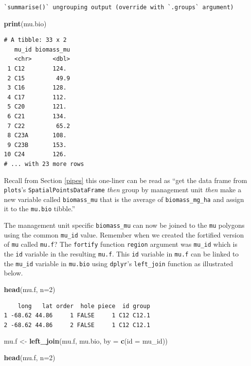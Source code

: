 \documentclass[
]{krantz}
\makeatletter
\newenvironment{Shaded}{\begin{snugshade}}{\end{snugshade}}
\newcommand{\DataTypeTok}[1]{\textcolor[rgb]{0.27,0.27,0.27}{#1}}
\newcommand{\DecValTok}[1]{\textcolor[rgb]{0.06,0.06,0.06}{#1}}
\newcommand{\KeywordTok}[1]{\textcolor[rgb]{0.27,0.27,0.27}{\textbf{#1}}}
\newcommand{\NormalTok}[1]{#1}
\newcommand{\StringTok}[1]{\textcolor[rgb]{0.5,0.5,0.5}{#1}}
\newenvironment{kframe}{%
\medskip{}
\setlength{\fboxsep}{.8em}
 \def\at@end@of@kframe{}%
 \ifinner\ifhmode%
  \def\at@end@of@kframe{\end{minipage}}%
  \begin{minipage}{\columnwidth}%
 \fi\fi%
 \def\FrameCommand##1{\hskip\@totalleftmargin \hskip-\fboxsep
 \colorbox{shadecolor}{##1}\hskip-\fboxsep
     \hskip-\linewidth \hskip-\@totalleftmargin \hskip\columnwidth}%
 \MakeFramed {\advance\hsize-\width
   \@totalleftmargin\z@ \linewidth\hsize
   \@setminipage}}%
 {\par\unskip\endMakeFramed%
 \at@end@of@kframe}
\renewenvironment{Shaded}{\begin{kframe}}{\end{kframe}}
\makeatother
\begin{document}
\begin{verbatim}
`summarise()` ungrouping output (override with `.groups` argument)
\end{verbatim}

\begin{Shaded}
\begin{Highlighting}[]
\KeywordTok{print}\NormalTok{(mu.bio)}
\end{Highlighting}
\end{Shaded}

\begin{verbatim}
# A tibble: 33 x 2
   mu_id biomass_mu
   <chr>      <dbl>
 1 C12        124. 
 2 C15         49.9
 3 C16        128. 
 4 C17        112. 
 5 C20        121. 
 6 C21        134. 
 7 C22         65.2
 8 C23A       108. 
 9 C23B       153. 
10 C24        126. 
# ... with 23 more rows
\end{verbatim}

Recall from Section \ref{pipes} this one-liner can be read as ``get the data frame from \texttt{plots}'s \texttt{SpatialPointsDataFrame} \emph{then} group by management unit \emph{then} make a new variable called \texttt{biomass\_mu} that is the average of \texttt{biomass\_mg\_ha} and assign it to the \texttt{mu.bio} tibble.''

The management unit specific \texttt{biomass\_mu} can now be joined to the \texttt{mu} polygons using the common \texttt{mu\_id} value. Remember when we created the fortified version of \texttt{mu} called \texttt{mu.f}? The \texttt{fortify} function \texttt{region} argument was \texttt{mu\_id} which is the \texttt{id} variable in the resulting \texttt{mu.f}. This \texttt{id} variable in \texttt{mu.f} can be linked to the \texttt{mu\_id} variable in \texttt{mu.bio} using \texttt{dplyr}'s \texttt{left\_join} function as illustrated below.

\begin{Shaded}
\begin{Highlighting}[]
\KeywordTok{head}\NormalTok{(mu.f, }\DataTypeTok{n=}\DecValTok{2}\NormalTok{)}
\end{Highlighting}
\end{Shaded}

\begin{verbatim}
    long   lat order  hole piece  id group
1 -68.62 44.86     1 FALSE     1 C12 C12.1
2 -68.62 44.86     2 FALSE     1 C12 C12.1
\end{verbatim}

\begin{Shaded}
\begin{Highlighting}[]
\NormalTok{mu.f \textless{}{-}}\StringTok{ }\KeywordTok{left\_join}\NormalTok{(mu.f, mu.bio, }\DataTypeTok{by =} \KeywordTok{c}\NormalTok{(}\StringTok{\textquotesingle{}id\textquotesingle{}}\NormalTok{ =}\StringTok{ \textquotesingle{}mu\_id\textquotesingle{}}\NormalTok{))}

\KeywordTok{head}\NormalTok{(mu.f, }\DataTypeTok{n=}\DecValTok{2}\NormalTok{)}
\end{Highlighting}
\end{Shaded}
\end{document}
